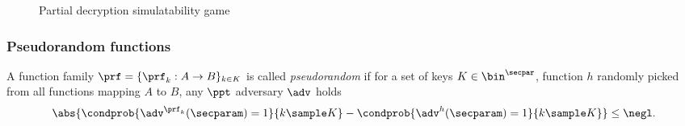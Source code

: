 \documentclass[runningheads,10pt]{llncs}
\numberwithin{equation}{section}
\begin{document}
\begin{figure}
   \centering
  \caption{Partial decryption simulatability game}
  \label{fig:game_pds}
\end{figure}

\subsubsection{Pseudorandom functions}

\newcommand{\pcfamilystyle}[1]{\mathcal{#1}} \newcommand{\cF}{\pcfamilystyle{F}}
A function family $\prf = \smallset{\prf_k: A \to B}_{k \in K}$ is called
\emph{pseudorandom} if for a set of keys $K \in \bin^{\secpar}$, function $h$
randomly picked from all functions mapping $A$ to $B$, any $\ppt$ adversary
$\adv$ holds
\[
\abs{\condprob{\adv^{\prf_k}(\secparam) = 1}{k \sample K} -
\condprob{\adv^{h}(\secparam) = 1}{k \sample
K}} \leq \negl.
\]
\end{document}
